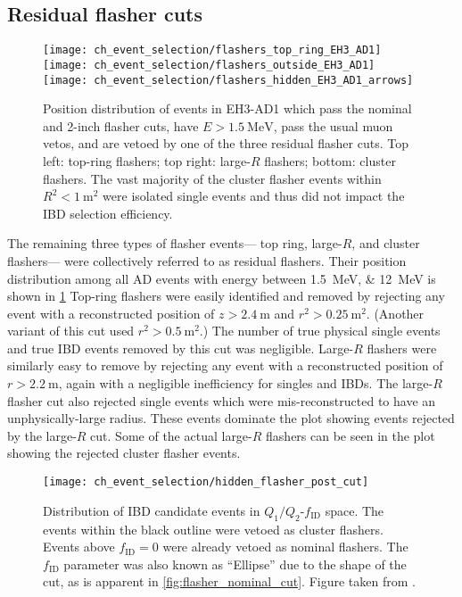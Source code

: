 \subsection{Residual flasher cuts}
\label{subsec:flash_resid}

\begin{figure}
    \centering
    \texttt{[image: ch\_event\_selection/flashers\_top\_ring\_EH3\_AD1]}
    \texttt{[image: ch\_event\_selection/flashers\_outside\_EH3\_AD1]}\\
    \texttt{[image: ch\_event\_selection/flashers\_hidden\_EH3\_AD1\_arrows]}
    \caption[Residual flasher position distributions]{
        Position distribution of events in EH3-AD1
        which pass the nominal and 2-inch flasher cuts,
        have $E > \SI{1.5}{\MeV}$, pass the usual muon vetos,
        and are vetoed by one of the three residual flasher cuts.
        Top left: top-ring flashers;
        top right: large-$R$ flashers;
        bottom: cluster flashers.
        The vast majority of the cluster flasher events
        within $R^2 < \SI{1}{\m\squared}$
        were isolated single events
        and thus did not impact the IBD selection efficiency.
    }
    \label{fig:flasher_resid_pos}
\end{figure}

The remaining three types of flasher events---%
top ring, large-$R$, and cluster flashers---%
were collectively referred to as residual flashers.
Their position distribution among all AD events
with energy between \SIlist{1.5;12}{\MeV}
is shown in \cref{fig:flasher_resid_pos}
Top-ring flashers were easily identified and removed
by rejecting any event with a reconstructed position
of $z > \SI{2.4}{\m}$ and $r^2 > \SI{0.25}{\m\squared}$.
(Another variant of this cut used $r^2 > \SI{0.5}{\m\squared}$.)
The number of true physical single events and
true IBD events removed by this cut was negligible.
Large-$R$ flashers were similarly easy to remove
by rejecting any event with a reconstructed position
of $r > \SI{2.2}{\m}$,
again with a negligible inefficiency for singles and IBDs.
The large-$R$ flasher cut also rejected
single events which were mis-reconstructed to have an unphysically-large radius.
These events dominate the plot showing events rejected by the large-$R$ cut.
Some of the actual large-$R$ flashers can be seen in the plot
showing the rejected cluster flasher events.

\begin{figure}
    \centering
    \texttt{[image: ch\_event\_selection/hidden\_flasher\_post\_cut]}
    \caption[Cluster flasher variables]{
        Distribution of IBD candidate events in $Q_1/Q_2$-$f_{\text{ID}}$ space.
        The events within the black outline were vetoed as
        cluster flashers.
        Events above $f_{\text{ID}}=0$ were already vetoed as nominal flashers.
        The $f_\text{ID}$ parameter was also known as ``Ellipse''
        due to the shape of the cut, as is apparent in \cref{fig:flasher_nominal_cut}.
        Figure taken from \cite{flasher_plots}.
    }
    \label{fig:hidden_flasher_cut}
\end{figure}

